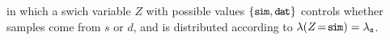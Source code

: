 \documentclass[twoside]{article}
\theoremstyle{plain}
\theoremstyle{definition}
\newcommand{\V}{\mathcal V}
\newcommand{\dg}[1]{\mathbdcal{#1}}
\begin{document}
in which a swich variable $Z$
with possible values
$
\{\texttt{s\kern-1.1pti\kern-0.8ptm},\texttt{d\kern-0.75pta\kern-1ptt}\}$
controls whether samples come from $s$ or $d$, and
is distributed according to
$\lambda(Z\!=\!\texttt{s\kern-1.1pti\kern-0.8ptm}) = \lambda_{\texttt{s}}$.
\end{document}

